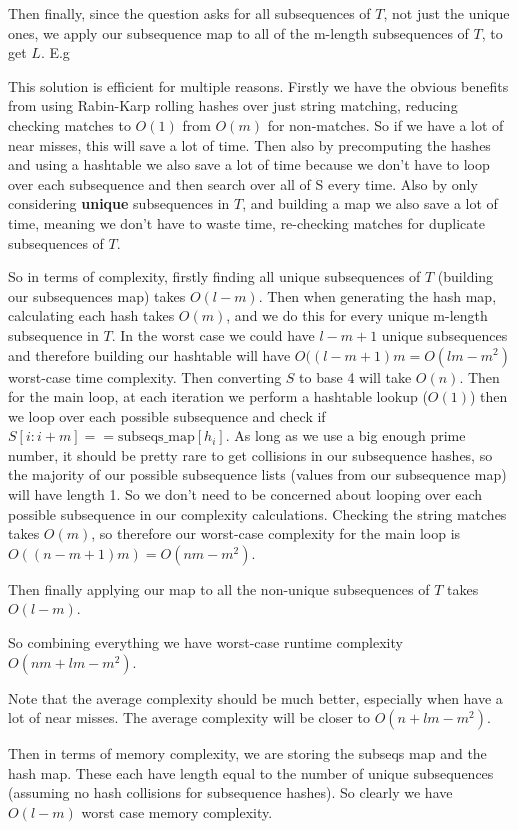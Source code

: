 \documentclass[a4paper, oneside]{book}
\begin{document}
Then finally, since the question asks for all subsequences of $T$, not just the unique ones,
we apply our subsequence map to all of the m-length subsequences of $T$, to get $L$. E.g

This solution is efficient for multiple reasons. Firstly we have the obvious benefits from
using Rabin-Karp rolling hashes over just string matching, reducing checking matches
to $O(1)$ from $O(m)$ for non-matches. So if we have a lot of near misses, this will
save a lot of time. Then also by precomputing the hashes and using a hashtable we also save a lot of time
because we don't have to loop over each subsequence and then search over all of S every time.
Also by only considering \textbf{unique} subsequences in $T$, and building a map
we also save a lot of time, meaning we don't have to waste time, re-checking matches
for duplicate subsequences of $T$. 

So in terms of complexity, firstly finding all unique subsequences of $T$ (building our subsequences map)
takes $O(l - m)$. Then when generating the hash map, calculating each hash takes $O(m)$, and we do this
for every unique m-length subsequence in $T$. In the worst case we could have $l - m + 1$
unique subsequences and therefore building our hashtable will have $O((l - m + 1)m = O(lm - m^2)$
worst-case time complexity. Then converting $S$ to base 4 will take $O(n)$.
Then for the main loop, at each iteration we perform a hashtable lookup ($O(1)$)
then we loop over each possible subsequence and check if $S[i:i+m] == \text{subseqs\_map}[h_i]$.
As long as we use a big enough prime number, it should be pretty rare to get collisions
in our subsequence hashes, so the majority of our possible subsequence lists (values from our subsequence map)
will have length 1. So we don't need to be concerned about looping over each possible subsequence in our complexity calculations.
Checking the string matches takes $O(m)$, so therefore our worst-case complexity for
the main loop is $O((n - m + 1)m) = O(nm - m^2)$.

Then finally applying our map to all the non-unique subsequences of $T$ takes $O(l - m)$.

So combining everything we have worst-case runtime complexity $O(nm + lm - m^2)$.

Note that the average complexity should be much better, especially when have a lot
of near misses. The average complexity will be closer to $O(n + lm - m^2)$.

Then in terms of memory complexity, we are storing the subseqs map and the hash map.
These each have length equal to the number of unique subsequences (assuming no hash collisions for subsequence hashes).
So clearly we have $O(l - m)$ worst case memory complexity.

\end{document}
